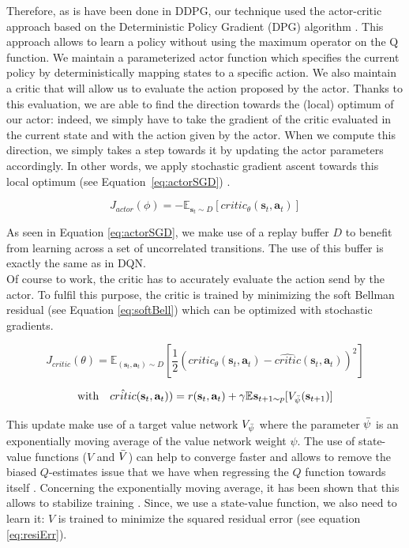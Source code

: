 Therefore, as is have been done in DDPG, our technique used the actor-critic approach based on the Deterministic Policy Gradient (DPG) algorithm \cite{dpg}. This approach allows to learn a policy without using the maximum operator on the Q function. We maintain a parameterized actor function which specifies the current policy by deterministically mapping states to a specific action. We also maintain a critic that will allow us to evaluate the action proposed by the actor. Thanks to this evaluation, we are able to find the direction towards the (local) optimum of our actor: indeed, we simply have to take the gradient of the critic evaluated in the current state and with the action given by the actor. When we compute this direction, we simply takes a step towards it by updating the actor parameters accordingly. In other words, we apply stochastic gradient ascent towards this local optimum (see Equation~\ref{eq:actorSGD}) .

\begin{equation}
    J_{actor}(\phi) = -  \mathbb E_{\textbf{s}_t \sim D}[critic_{ \theta}(\textbf{s}_t, \textbf{a}_t)]
    \label{eq:actorSGD}
\end{equation}

As seen in Equation \ref{eq:actorSGD}, we make use of a replay buffer $D$ to benefit from learning across a set of uncorrelated transitions. The use of this buffer is exactly the same as in DQN. \\

Of course to work, the critic has to accurately evaluate the action send by the actor. To fulfil this purpose, the critic is trained by minimizing the soft Bellman residual (see Equation \ref{eq:softBell}) which can be optimized with stochastic gradients.

\begin{equation}
    J_{critic}(\theta) = \mathbb E_{(\textbf{s}_t, \textbf{a}_t)\sim D}[\frac{1}{2}(critic_{ \theta}(\textbf{s}_t, \textbf{a}_t)- \hat{critic}(\textbf{s}_t, \textbf{a}_t))^2]
    \label{eq:softBell}
\end{equation} 

\begin{equation}
    \text{with~~~} \hat{critic}(\textbf{s}_t, \textbf{a}_t)) = r(\textbf{s}_t, \textbf{a}_t) + \gamma \mathbb E_{}\textbf{s}_{t+1 \sim p}  [V_{\Bar{\psi}}(\textbf{s}_{t+1})]
\end{equation}

This update make use of a target value network $V_{\Bar{\psi}}$ where the parameter $\Bar{\psi}$ is an exponentially moving average of the value network weight $\psi$. The use of state-value functions ($V$ and $\Bar{V}$) can help to converge faster and allows to remove the biased $Q$-estimates issue that we have when regressing the $Q$ function towards itself \cite{deep}. Concerning the exponentially moving average, it has been shown that this allows to stabilize training \cite{expoMovAvg}. Since, we use a state-value function, we also need to learn it: $V$ is trained to minimize the squared residual error (see equation \ref{eq:resiErr}).


